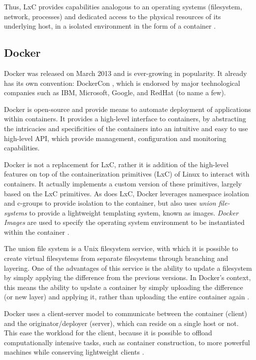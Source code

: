 \documentclass[12pt, titlepage]{uo_temp}
\begin{document}
     Thus, LxC provides capabilities analogous to an operating systems (filesystem, network,
     processes) and dedicated access to the physical resources of its underlying host, in a
     isolated environment in the form of a container \cite{dell}.

     \subsection{Docker}\label{bkg_docker}
     Docker was released on March 2013 and is ever-growing in popularity. It already has
     its own convention: DockerCon \cite{dockercon}, which is endorsed by major
     technological companies such as IBM, Microsoft, Google, and RedHat (to name a few).

     Docker is open-source and provide means to automate deployment of applications within
     containers. It provides a high-level interface to containers, by abstracting the
     intricacies and specificities of the containers into an intuitive and easy to use
     high-level API, which provide management, configuration and monitoring capabilities.
     
     Docker is not a replacement for LxC, rather it is addition of the high-level features
     on top of the containerization primitives (LxC) of Linux to interact with
     containers. It actually implements a custom version of these primitives, largely
     based on the LxC primitives. As does LxC, Docker leverages namespace isolation and
     c-groups to provide isolation to the container, but also uses \emph{union
       file-systems} to provide a lightweight templating system, known as
     images. \emph{Docker Images} are used to specify the operating system environment to
     be instantiated within the container \cite{docker}.

     The union file system is a Unix filesystem service, with which it is possible to
     create virtual filesystems from separate filesystems through branching and
     layering. One of the advantages of this service is the ability to update a filesystem
     by simply applying the difference from the previous versions. In Docker's context,
     this means the ability to update a container by simply uploading the difference (or
     new layer) and applying it, rather than uploading the entire container again \cite{docker}.
     
     Docker uses a client-server model to communicate between the container (client) and
     the originator/deployer (server), which can reside on a single host or not. This ease
     the workload for the client, because it is possible to offload computationally
     intensive tasks, such as container construction, to more powerful machines while
     conserving lightweight clients \cite{docker}.
    
\end{document}
